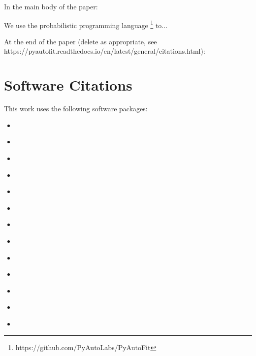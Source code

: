In the main body of the paper:

We use the probabilistic programming language \footnote{https://github.com/PyAutoLabs/PyAutoFit} \citep{pyautofit} to...

At the end of the paper (delete as appropriate, see https://pyautofit.readthedocs.io/en/latest/general/citations.html):

\section*{Software Citations}

This work uses the following software packages:

\begin{itemize}

\item
\href{https://github.com/blackjax-devs/blackjax}{}
\citep{blackjax}

\item
\href{https://github.com/dfm/corner.py}{}
\citep{corner}

\item
\href{https://github.com/joshspeagle/dynesty}{}
\citep{dynesty}

\item
\href{https://github.com/dfm/emcee}{}
\citep{emcee}

\item
\href{https://github.com/matplotlib/matplotlib}{}
\citep{matplotlib}

\item
\href{https://github.com/johannesulf/nautilus}{}
\citep{nautilus}

\item
\href{https://github.com/numpy/numpy}{}
\citep{numpy}

\item
\href{https://github.com/google-deepmind/optax}{}
\citep{optax}

\item
\href{https://github.com/konstmish/prodigy}{}
\citep{prodigy}

\item
\href{https://www.python.org/}{}
\citep{python}

\item
\href{https://github.com/scipy/scipy}{}
\citep{scipy}

\item
\href{https://www.sqlite.org/index.html}{}
\citep{sqlite2020}

\item
\href{https://github.com/minaskar/zeus}{}
\citep{zeus1, zeus2}

\end{itemize}